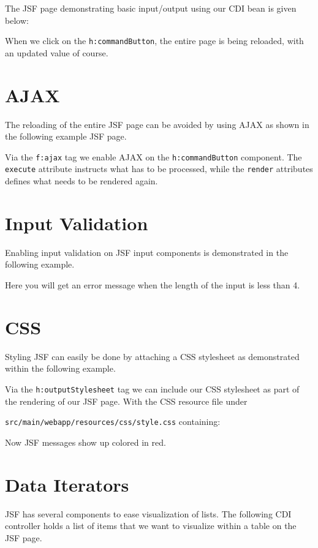 The JSF page demonstrating basic input/output using our CDI bean is given below:

When we click on the \texttt{h:commandButton}, the entire page is being reloaded, with an updated value of course.


\section{AJAX}

The reloading of the entire JSF page can be avoided by using AJAX as shown in the following example JSF page.

Via the \texttt{f:ajax} tag we enable AJAX on the \texttt{h:commandButton} component.
The \texttt{execute} attribute instructs what has to be processed, while the \texttt{render} attributes defines what needs to be rendered again.


\section{Input Validation}

Enabling input validation on JSF input components is demonstrated in the following example.

Here you will get an error message when the length of the input is less than 4.

\section{CSS}

Styling JSF can easily be done by attaching a CSS stylesheet as demonstrated within the following example.

Via the \texttt{h:outputStylesheet} tag we can include our CSS stylesheet as part of the rendering of our JSF page.
With the CSS resource file under

\texttt{src/main/webapp/resources/css/style.css} containing:

Now JSF messages show up colored in red.

\section{Data Iterators}

JSF has several components to ease visualization of lists.
The following CDI controller holds a list of items that we want to visualize within a table on the JSF page.


